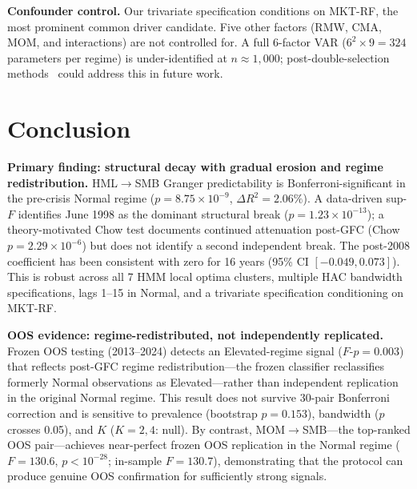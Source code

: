 \documentclass[sigconf,anonymous]{acmart}
\begin{document}
\textbf{Confounder control.}
Our trivariate specification conditions on MKT-RF, the most prominent common
driver candidate. Five other factors (RMW, CMA, MOM, and interactions) are
not controlled for. A full 6-factor VAR ($6^2 \times 9 = 324$ parameters
per regime) is under-identified at $n \approx 1{,}000$; post-double-selection
methods~\cite{hecq2023granger} could address this in future work.

\section{Conclusion}

\textbf{Primary finding: structural decay with gradual erosion and regime redistribution.}
HML$\to$SMB Granger predictability is Bonferroni-significant in the
pre-crisis Normal regime ($p = 8.75 \times 10^{-9}$, $\Delta R^2 = 2.06\%$).
A data-driven sup-$F$ identifies June 1998 as the dominant structural break
($p = 1.23 \times 10^{-13}$); a theory-motivated Chow test documents
continued attenuation post-GFC (Chow $p = 2.29 \times 10^{-6}$) but does
not identify a second independent break. The post-2008 coefficient has been
consistent with zero for 16 years (95\% CI $[-0.049, 0.073]$).
This is robust across all 7 HMM local optima clusters, multiple HAC bandwidth
specifications, lags 1--15 in Normal, and a trivariate specification conditioning on MKT-RF.

\textbf{OOS evidence: regime-redistributed, not independently replicated.}
Frozen OOS testing (2013--2024) detects an Elevated-regime signal
($F$-$p = 0.003$) that reflects post-GFC regime redistribution---the
frozen classifier reclassifies formerly Normal observations as Elevated---rather
than independent replication in the original Normal regime.
This result does not survive 30-pair Bonferroni correction and is sensitive to
prevalence (bootstrap $p = 0.153$), bandwidth ($p$ crosses 0.05), and
$K$ ($K = 2, 4$: null). By contrast, MOM$\to$SMB---the top-ranked OOS
pair---achieves near-perfect frozen OOS replication in the Normal regime
($F = 130.6$, $p < 10^{-28}$; in-sample $F = 130.7$), demonstrating that the
protocol can produce genuine OOS confirmation for sufficiently strong signals.
\end{document}
